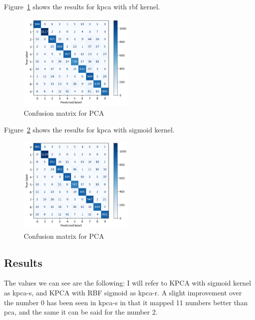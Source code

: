 Figure~\ref{fig:confusion-matrix-kernel-pca-svm-rbf} shows the results for \gls{kpca} with rbf kernel.
\begin{figure}[htb!]
    \centering
    \includegraphics[width=0.5\textwidth]{../src/results/experiment_three/kernel_pca_rbf_kernel_49.png}
    \caption{Confusion matrix for PCA}
    \label{fig:confusion-matrix-kernel-pca-svm-rbf}
\end{figure}

Figure~\ref{fig:confusion-matrix-kernel-pca-svm-sigmoid} shows the results for \gls{kpca} with sigmoid kernel.
\begin{figure}[htb!]
    \centering
    \includegraphics[width=0.5\textwidth]{../src/results/experiment_three/confusion_matrix_kernel_pca_svm_sigmoid.png}
    \caption{Confusion matrix for PCA}
    \label{fig:confusion-matrix-kernel-pca-svm-sigmoid}
\end{figure}

\subsection{Results}
The values we can see are the following: I will refer to KPCA with sigmoid kernel as \gls{kpca-s}, and KPCA with RBF sigmoid as \gls{kpca-r}. A slight improvement over the number 0 has been seen in \gls{kpca-s} in that it mapped 11 numbers better than \gls{pca}, and the same it can be said for the number 2.

